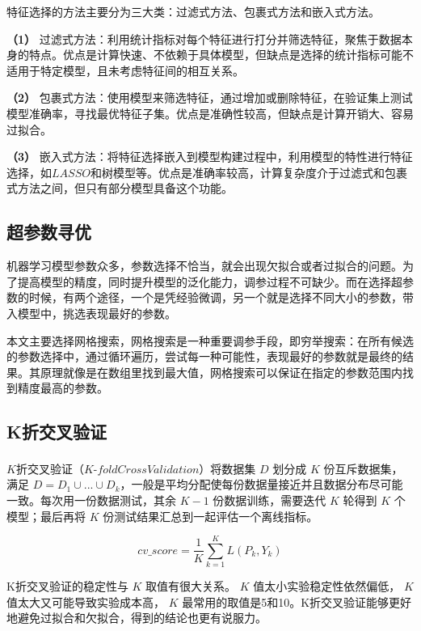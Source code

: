 \documentclass[withoutpreface,bwprint]{cumcmthesis}
\begin{document}
特征选择的方法主要分为三大类：过滤式方法、包裹式方法和嵌入式方法。

\textbf{（1）} 过滤式方法：利用统计指标对每个特征进行打分并筛选特征，聚焦于数据本身的特点。优点是计算快速、不依赖于具体模型，但缺点是选择的统计指标可能不适用于特定模型，且未考虑特征间的相互关系。

\textbf{（2）} 包裹式方法：使用模型来筛选特征，通过增加或删除特征，在验证集上测试模型准确率，寻找最优特征子集。优点是准确性较高，但缺点是计算开销大、容易过拟合。

\textbf{（3）} 嵌入式方法：将特征选择嵌入到模型构建过程中，利用模型的特性进行特征选择，如\(LASSO\)和树模型等。优点是准确率较高，计算复杂度介于过滤式和包裹式方法之间，但只有部分模型具备这个功能。




\subsection{超参数寻优}

机器学习模型参数众多，参数选择不恰当，就会出现欠拟合或者过拟合的问题。为了提高模型的精度，同时提升模型的泛化能力，调参过程不可缺少。而在选择超参数的时候，有两个途径，一个是凭经验微调，另一个就是选择不同大小的参数，带入模型中，挑选表现最好的参数。

本文主要选择网格搜索，网格搜索是一种重要调参手段，即穷举搜索：在所有候选的参数选择中，通过循环遍历，尝试每一种可能性，表现最好的参数就是最终的结果。其原理就像是在数组里找到最大值，网格搜索可以保证在指定的参数范围内找到精度最高的参数。


\subsection{K折交叉验证}

\(K\)折交叉验证\textsuperscript{\cite{triba2015pls}}（\(K\)-\(fold Cross Validation\)）将数据集 \( D \) 划分成 \( K \) 份互斥数据集，满足 \( D = D_1 \cup ... \cup D_k \)，一般是平均分配使每份数据量接近并且数据分布尽可能一致。每次用一份数据测试，其余 \( K - 1 \) 份数据训练，需要迭代 \( K \) 轮得到 \( K \) 个模型；最后再将 \( K \) 份测试结果汇总到一起评估一个离线指标。

\[ cv\_score = \frac{1}{K} \sum_{k=1}^{K} L(P_k, Y_k) \] 

K折交叉验证的稳定性与 \( K \) 取值有很大关系。 \( K \) 值太小实验稳定性依然偏低， \( K \) 值太大又可能导致实验成本高， \( K \) 最常用的取值是5和10。K折交叉验证能够更好地避免过拟合和欠拟合，得到的结论也更有说服力。
\end{document}
